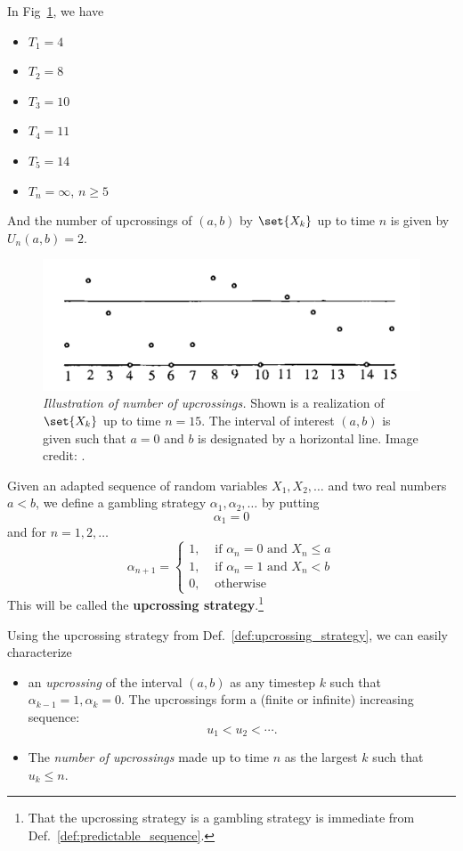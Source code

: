 \documentclass{article} %
\begin{document}
\begin{example}
In Fig~\ref{fig:number_of_upcrossings}, we have 
\begin{itemize}
\item $T_1 = 4$
\item $T_2 = 8$
\item $T_3 = 10$
\item $T_4 = 11$
\item $T_5 = 14$
\item $T_n = \infty$, $n \geq 5$
\end{itemize}
And the number of upcrossings of $(a,b)$ by $\set{X_k}$ up to time $n$ is given by $U_n(a,b)=2$.

\begin{figure}[H]
\centering
\includegraphics[width=.6\textwidth]{images/upcrossings.png}
\caption{\textit{Illustration of number of upcrossings.}  Shown is a realization of  $\set{X_k}$ up to time $n=15$.  The interval of interest $(a,b)$ is given such that $a=0$ and $b$ is designated by a horizontal line. Image credit: \cite[pp.259]{ash2000probability}.}
\label{fig:number_of_upcrossings}
\end{figure}
\end{example}

\begin{definition}
Given an adapted sequence of random variables $X_1, X_2, \hdots$ and two real numbers $a < b$, we define a gambling strategy $\alpha_1, \alpha_2, \hdots$ by putting 
\[ \alpha_1 = 0\]
and for $n=1,2,\hdots$
\[ \alpha_{n+1} = 
\begin{cases}
1, & \text{ if } \alpha_n=0 \text{ and } X_n \leq a \\
1, & \text{ if } \alpha_n=1 \text{ and } X_n < b \\  
0, & \text{ otherwise }	
 \end{cases}
 \]
 This will be called the \textbf{upcrossing strategy}.\footnote{That the upcrossing strategy is a gambling strategy is immediate from Def.~\ref{def:predictable_sequence}.}
\label{def:upcrossing_strategy}	
\end{definition}

\begin{remark}
Using the upcrossing strategy from Def.~\ref{def:upcrossing_strategy}, we can easily characterize
%
\begin{itemize}
	\item an \textit{upcrossing} of the interval $(a,b)$ as any timestep $k$ such that $\alpha_{k-1} = 1, \alpha_{k}=0$.   The upcrossings form a (finite or infinite) increasing sequence:
		 \[u_1 < u_2 < \cdots .\]
	\item The \textit{number of upcrossings} made up to time $n$ as the largest $k$ such that $u_k \leq n$.
\end{itemize}	
\end{remark}
\end{document}
